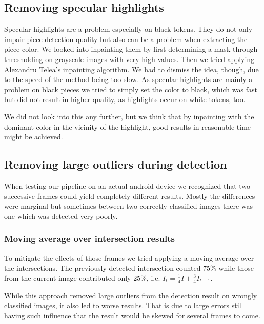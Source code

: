 	\subsection{Removing specular highlights}
	\label{evaluation-prepostprocessing-specularHighlights}
	Specular highlights are a problem especially on black tokens. They do not only impair piece detection quality but also can be a problem when extracting the piece color. We looked into inpainting them by first determining a mask through thresholding on grayscale images with very high values. Then we tried applying Alexandru Telea's inpainting algorithm\cite{telea2004image}. We had to dismiss the idea, though, due to the speed of the method being too slow. As specular highlights are mainly a problem on black pieces we tried to simply set the color to black, which was fast but did not result in higher quality, as highlights occur on white tokens, too.

	We did not look into this any further, but we think that by inpainting with the dominant color in the vicinity of the highlight, good results in reasonable time might be achieved.

	\subsection{Removing large outliers during detection}
	\label{evaluation-prepostprocessing-filteringOutliers}
	When testing our pipeline on an actual android device we recognized that two successive frames could yield completely different results. Mostly the differences were marginal but sometimes between two correctly classified images there was one which was detected very poorly.

	\subsubsection{Moving average over intersection results}
	\label{evaluation-prepostprocessing-filteringOutliers-movingAverage}
	To mitigate the effects of those frames we tried applying a moving average over the intersections. The previously detected intersection counted 75\% while those from the current image contributed only 25\%, i.e. $I_t = \frac{1}{4}I + \frac{3}{4}I_{t-1}$.

	While this approach removed large outliers from the detection result on wrongly classified images, it also led to worse results. That is due to large errors still having such influence that the result would be skewed for several frames to come.

